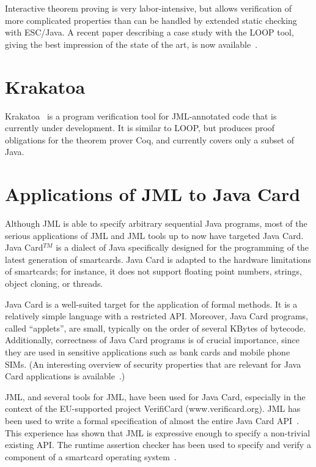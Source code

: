 Interactive theorem proving is very labor-intensive, but allows
verification of more complicated properties than can be handled by
extended static checking with ESC/Java.  A recent paper describing a
case study with the LOOP tool, giving the best impression of the state
of the art, is now available~\cite{BreunesseBJ02}.

 \section{Krakatoa}
 \label{krakatoa}
 
 Krakatoa~\cite{krakatoa03a} is a
 program verification tool for JML-annotated code that is currently
 under development.  It is similar to LOOP, but produces proof
 obligations for the theorem prover Coq, and
 currently covers only a subset of Java.

\section{Applications of JML to Java Card}
\label{applications}

Although JML is able to specify arbitrary sequential Java programs,
most of the serious applications of JML and JML tools up to now
have targeted Java Card.  Java Card$^{TM}$ is a dialect of Java specifically
designed for the programming of the latest generation of smartcards.
Java Card is adapted to the hardware limitations of smartcards; for
instance, it does not support floating point numbers, strings, object
cloning, or threads.

Java Card is a well-suited target for the application of formal
methods.  It is a relatively simple language with a restricted API\@.
Moreover, Java Card programs, called ``applets'', are small, typically
on the order of several KBytes of bytecode.  Additionally, correctness
of Java Card programs is of crucial importance, since they are used in
sensitive applications such as bank cards and mobile phone SIMs.  (An
interesting overview of security properties that are relevant for Java
Card applications is available~\cite{MarletLM01}.)

JML, and several tools for JML, have been used for Java Card,
especially in the context of the EU-supported project VerifiCard
(www.verificard.org).  JML has been used to write a formal
specification of almost the entire Java Card
API~\cite{PollBergJacobs01}.  This experience has shown that JML is
expressive enough to specify a non-trivial existing API\@.  The
runtime assertion checker has been used to specify and verify a
component of a smartcard operating system~\cite{PollHarteldeJong02}.

